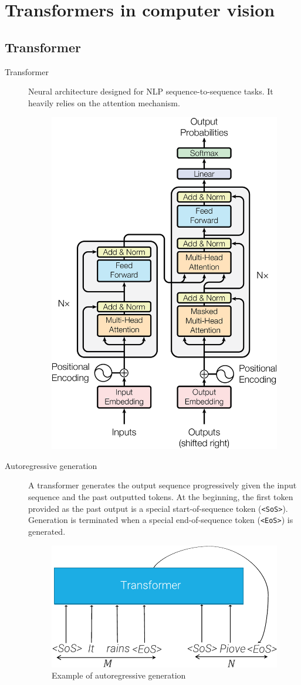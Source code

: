 \chapter{Transformers in computer vision}



\section{Transformer}

\begin{description}
    \item[Transformer] 
        Neural architecture designed for NLP sequence-to-sequence tasks. It heavily relies on the attention mechanism.
        \begin{figure}[H]
            \centering
            \includegraphics[width=0.4\linewidth]{./img/transformer.png}
        \end{figure}

    \item[Autoregressive generation] 
        A transformer generates the output sequence progressively given the input sequence and the past outputted tokens. At the beginning, the first token provided as the past output is a special start-of-sequence token (\texttt{<SoS>}). Generation is terminated when a special end-of-sequence token (\texttt{<EoS>}) is generated.

        \begin{figure}[H]
            \centering
            \includegraphics[width=0.3\linewidth]{./img/_transformer_autoregressive.pdf}
            \caption{Example of autoregressive generation}
        \end{figure}
\end{description}


